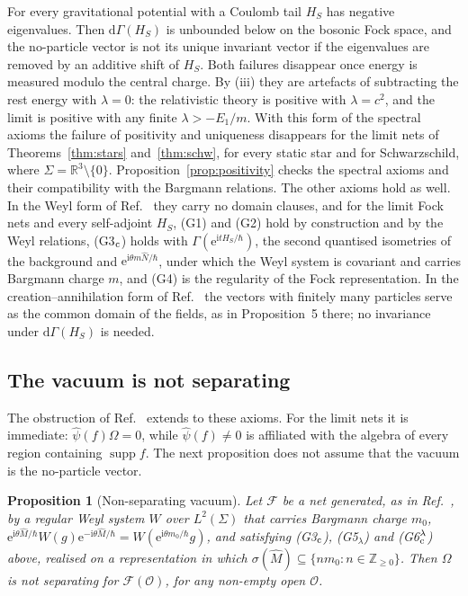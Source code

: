 \documentclass[%
 aip,
 jmp,
 amsmath,amssymb,
 reprint, onecolumn
]{revtex4-1}
\newtheorem{proposition}{Proposition}
\theoremstyle{definition}
\theoremstyle{remark}
\newcommand{\R}{\mathbb{R}}
\newcommand{\Z}{\mathbb{Z}}
\newcommand{\F}{\mathcal{F}}
\newcommand{\Op}{\mathcal{O}}
\newcommand{\rmd}{\mathrm{d}}
\newcommand{\rmi}{\mathrm{i}}
\newcommand{\rme}{\mathrm{e}}
\DeclareMathOperator{\supp}{supp}
\begin{document}
For every gravitational potential with a Coulomb tail $H_S$ has
negative eigenvalues. Then $\rmd\Gamma(H_S)$ is unbounded below on the
bosonic Fock space, and the no-particle vector is not its unique
invariant vector if the eigenvalues are removed by an additive shift of
$H_S$. Both failures disappear once energy is measured modulo the
central charge. By (iii) they are artefacts of subtracting the rest
energy with $\lambda=0$: the relativistic theory is positive with
$\lambda=c^2$, and the limit is positive with any finite
$\lambda>-E_1/m$. With this form of the spectral axioms the failure of
positivity and uniqueness disappears for the limit nets of Theorems~\ref{thm:stars}
and~\ref{thm:schw}, for every static star and for Schwarzschild, where
$\Sigma=\R^3\setminus\{0\}$. Proposition~\ref{prop:positivity} checks the
spectral axioms and their compatibility with the Bargmann relations. The
other axioms hold as well. In the Weyl form of
Ref.~ they carry
no domain clauses, and for the limit Fock nets and every self-adjoint
$H_S$, (G1) and (G2) hold by construction and by the Weyl relations,
(G3$_{\rm c}$) holds with $\Gamma(\rme^{\rmi tH_S/\hbar})$, the second
quantised isometries of the background and $\rme^{\rmi\theta m\hat
N/\hbar}$, under which the Weyl system is covariant and carries Bargmann
charge $m$, and (G4) is the regularity of the Fock representation. In
the creation--annihilation form of
Ref.~ the
vectors with finitely many particles serve as the common domain of the
fields, as in Proposition~5 there; no invariance under $\rmd\Gamma(H_S)$
is needed.

\subsection{The vacuum is not separating}

The obstruction of
Ref.~ extends to
these axioms. For the limit nets it is immediate: $\hat\psi(f)\Omega=0$,
while $\hat\psi(f)\neq0$ is affiliated with the algebra of every region
containing $\supp f$. The next proposition does not assume that the
vacuum is the no-particle vector.

\begin{proposition}[Non-separating vacuum]\label{prop:nonseparating}
Let $\F$ be a net generated, as in
Ref.~, by a
regular Weyl system $W$ over $L^2(\Sigma)$ that carries Bargmann charge
$m_0$, $\rme^{\rmi\theta\hat M/\hbar}W(g)\rme^{-\rmi\theta\hat M/\hbar}=
W(\rme^{\rmi\theta m_0/\hbar}g)$, and satisfying (G3$_{\rm c}$),
(G5$_\lambda$) and (G6$_{\rm c}^\lambda$) above, realised on a
representation in which $\sigma(\hat M)\subseteq\{nm_0:n\in\Z_{\geq0}\}$.
Then $\Omega$ is not separating for $\F(\Op)$, for any non-empty open
$\Op$.
\end{proposition}
\end{document}
